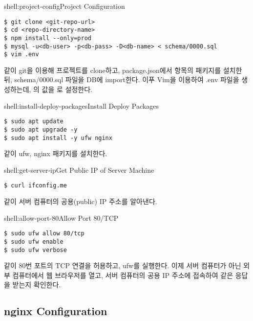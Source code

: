\begin{shellenv}{shell:project-config}{Project Configuration}\begin{verbatim}
$ git clone <git-repo-url>
$ cd <repo-directory-name>
$ npm install --only=prod
$ mysql -u<db-user> -p<db-pass> -D<db-name> < schema/0000.sql
$ vim .env
\end{verbatim}
\end{shellenv}

\와 같이 git을 이용해 프로젝트를 clone하고, package.json에서  항목의 패키지를 설치한 뒤, schema/0000.sql 파일을 DB에 import한다. 이푸 Vim을 이용하여 .env 파일을 생성하는데, 의 값을 로 설정한다.

\begin{shellenv}{shell:install-deploy-packages}{Install Deploy Packages}\begin{verbatim}
$ sudo apt update
$ sudo apt upgrade -y
$ sudo apt install -y ufw nginx
\end{verbatim}
\end{shellenv}

\와 같이 ufw, nginx 패키지를 설치한다.

\begin{shellenv}{shell:get-server-ip}{Get Public IP of Server Machine}\begin{verbatim}
$ curl ifconfig.me
\end{verbatim}
\end{shellenv}

\와 같이 서버 컴퓨터의 공용(public) IP 주소를 알아낸다.

\begin{shellenv}{shell:allow-port-80}{Allow Port 80/TCP}\begin{verbatim}
$ sudo ufw allow 80/tcp
$ sudo ufw enable
$ sudo ufw verbose
\end{verbatim}
\end{shellenv}

\과 같이 80번 포트의 TCP 연결을 허용하고, ufw를 실행한다. 이제 서버 컴퓨터가 아닌 외부 컴퓨터에서 웹 브라우저를 열고, 서버 컴퓨터의 공용 IP 주소에 접속하여 \와 같은 응답을 받는지 확인한다.


\subsection*{nginx Configuration}


